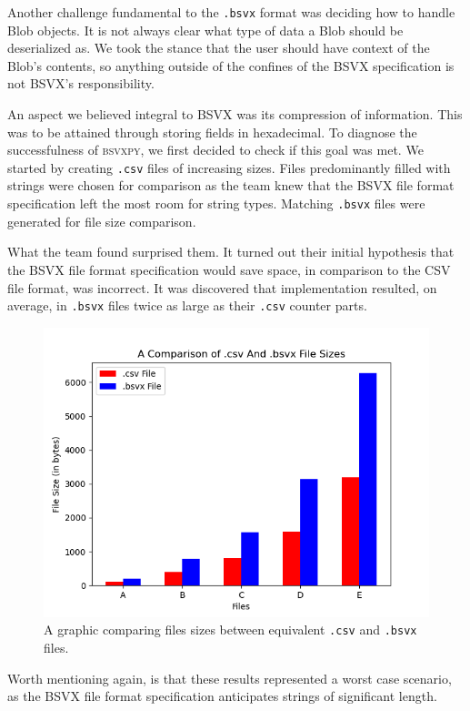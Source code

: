 \documentclass[10pt]{article}
\begin{document}
\indent{}
Another challenge fundamental to the \texttt{.bsvx} format was deciding how to handle Blob objects.
It is not always clear what type of data a Blob should be deserialized as.
We took the stance that the user should have context of the Blob's contents, so anything outside of the confines of the BSVX specification is not BSVX's responsibility.

\indent{}
An aspect we believed integral to BSVX was its compression of information.
This was to be attained through storing fields in hexadecimal.
To diagnose the successfulness of \textsc{bsvxpy}, we first decided to check if this goal was met.
We started by creating \texttt{.csv} files of increasing sizes.
Files predominantly filled with strings were chosen for comparison as the team knew that the BSVX file format specification left the most room for string types.
Matching \texttt{.bsvx} files were generated for file size comparison.

\indent{}
What the team found surprised them.
It turned out their initial hypothesis that the BSVX file format specification would save space, in comparison to the CSV file format, was incorrect.
It was discovered that implementation resulted, on average, in \texttt{.bsvx} files twice as large as their \texttt{.csv} counter parts.

\begin{figure}[H]
\centering
\includegraphics[width=5in]{figures/1.png}
\caption{A graphic comparing files sizes between equivalent \texttt{.csv} and \texttt{.bsvx} files.}
\label{fig:results_1}
\end{figure}

\indent{}
Worth mentioning again, is that these results represented a worst case scenario, as the BSVX file format specification anticipates strings of significant length.
\end{document}
